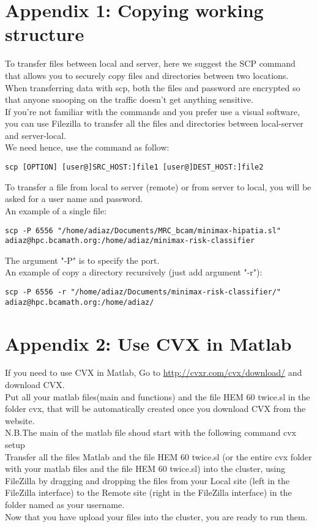 \documentclass[a4paper]{article}
\begin{document}
	\section{Appendix 1: Copying working structure}
		To transfer files between local and server, here we suggest the SCP command that allows you to securely copy files and directories between two locations.\\
		When transferring data with scp, both the files and password are encrypted so that anyone snooping on the traffic doesn’t get anything sensitive.\\
		If you're not familiar with the commands and you prefer use a visual software, you can use Filezilla to transfer all the files and directories between local-server and server-local.\\
		We need hence, use the command as follow:
		\begin{lstlisting}[caption=scp command, label=lst:scpCommand]
			scp [OPTION] [user@]SRC_HOST:]file1 [user@]DEST_HOST:]file2
		\end{lstlisting}
		To transfer a file from local to server (remote) or from server to local, you will be asked for a user name and password.\\
		An example of a single file:
		\begin{lstlisting}[caption=scp example file, label=lst:scpExampleFile]
			scp -P 6556 "/home/adiaz/Documents/MRC_bcam/minimax-hipatia.sl" adiaz@hpc.bcamath.org:/home/adiaz/minimax-risk-classifier 
		\end{lstlisting}
		The argument "-P" is to specify the port.\\
		An example of copy a directory recursively (just add argument "-r"):
		\begin{lstlisting}[caption=scp example directory, label=lst:scpExampleDirectory]
			scp -P 6556 -r "/home/adiaz/Documents/minimax-risk-classifier/" adiaz@hpc.bcamath.org:/home/adiaz/
		\end{lstlisting}
		
	\section{Appendix 2: Use CVX in Matlab}
		If you need to use CVX in Matlab, Go to \url{http://cvxr.com/cvx/download/} and download CVX.\\
		Put all your matlab files(main and functions) and the file HEM 60 twice.sl
		in the folder cvx, that will be automatically created once you download CVX
		from the website.\\
		N.B.The main of the matlab file shoud start with the following command
		cvx setup\\
		Transfer all the files Matlab and the file HEM 60 twice.sl (or the entire
		cvx folder with your matlab files and the file HEM 60 twice.sl) into the cluster,
		using FileZilla by dragging and dropping the files from your Local site (left in
		the FileZilla interface) to the Remote site (right in the FileZilla interface) in the folder named as your username.\\
		Now that you have upload your files into the cluster, you are ready to run
		them.\\
\end{document}
